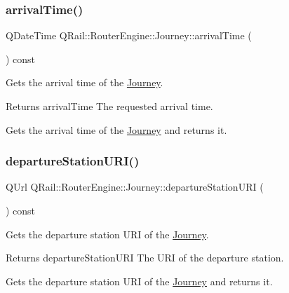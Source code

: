 \subsubsection{\texorpdfstring{arrivalTime()}{arrivalTime()}}
{\footnotesize\ttfamily Q\+Date\+Time Q\+Rail\+::\+Router\+Engine\+::\+Journey\+::arrival\+Time (\begin{DoxyParamCaption}{ }\end{DoxyParamCaption}) const}



Gets the arrival time of the \mbox{\hyperlink{classQRail_1_1RouterEngine_1_1Journey}{Journey}}. 

\begin{DoxyReturn}{Returns}
arrival\+Time The requested arrival time.
\end{DoxyReturn}
Gets the arrival time of the \mbox{\hyperlink{classQRail_1_1RouterEngine_1_1Journey}{Journey}} and returns it. \mbox{\label{classQRail_1_1RouterEngine_1_1Journey_ad541f71d07fc32b762463cf4241d03db}} 
\subsubsection{\texorpdfstring{departureStationURI()}{departureStationURI()}}
{\footnotesize\ttfamily Q\+Url Q\+Rail\+::\+Router\+Engine\+::\+Journey\+::departure\+Station\+U\+RI (\begin{DoxyParamCaption}{ }\end{DoxyParamCaption}) const}



Gets the departure station U\+RI of the \mbox{\hyperlink{classQRail_1_1RouterEngine_1_1Journey}{Journey}}. 

\begin{DoxyReturn}{Returns}
departure\+Station\+U\+RI The U\+RI of the departure station.
\end{DoxyReturn}
Gets the departure station U\+RI of the \mbox{\hyperlink{classQRail_1_1RouterEngine_1_1Journey}{Journey}} and returns it. \mbox{\label{classQRail_1_1RouterEngine_1_1Journey_a58b92b24d9d29ebb3cb47994b92eaa13}} 
